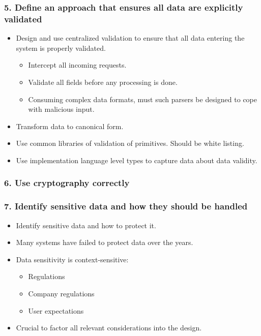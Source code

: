 \documentclass[12pt,norsk]{beamer}
\begin{document}
\begin{frame}

	\frametitle{5. Define an approach that ensures all data are explicitly validated}
	
	\begin{itemize}
		\item Design and use centralized validation to ensure that all data entering the system is properly validated. 
		\begin{itemize}
			\item Intercept all incoming requests.
			\item Validate all fields before any processing is done.
			\item Consuming complex data formats, must such parsers be designed to cope with malicious input.

		\end{itemize}

		\item Transform data to canonical form.
		\item Use common libraries of validation of primitives. Should be white listing. 
		\item Use implementation language level types to capture data about data validity. 				
	
	\end{itemize}
	

\end{frame}

\begin{frame}

	\frametitle{6. Use cryptography correctly}
	

\end{frame}

\begin{frame}

	\frametitle{7. Identify sensitive data and how they should be handled}
	\begin{itemize}
		\item Identify sensitive data and how to protect it.
		\item Many systems have failed to protect data over the years.
		\item Data sensitivity is context-sensitive:
		\begin{itemize}
			\item Regulations
			\item Company regulations
			\item User expectations
		\end{itemize}
		\item Crucial to factor all relevant considerations into the design.
		
	\end{itemize}
	

\end{frame}
\end{document}

